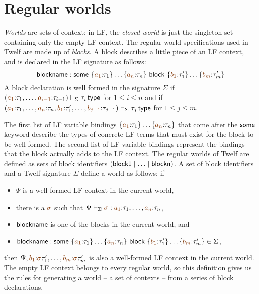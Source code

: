 

\section{Regular worlds}
\label{sec:gen-worlds}

{\it Worlds} are sets of context: in LF, the {\it closed world} is
just the singleton set containing only the empty LF context.  The
regular world specifications used in Twelf
\cite{schurmann00automating} are made up of {\it blocks}. A block
describes a little piece of an LF context, and is declared in the LF
signature as follows:
\[
 {\sf blockname} :
 {\sf some}~\{\lf{a_1}{:}\tau_1\}\ldots\{\lf{a_n}{:}\tau_n\}
~{\sf block}~\{\lf{b_1}{:}\tau'_1\}\ldots\{\lf{b_m}{:}\tau'_m\}
\]
A block declaration is well formed in the signature $\Sigma$ if 
$\left(\lf{a_1}{:}\tau_1,\ldots,\lf{a_{i-1}}{:} \tau_{i-1} \right)\vdash_\Sigma
\tau_i \,{\sf type}$ for $1 \leq i \leq n$ and if 
$\left(\lf{a_1}{:}\tau_1,\ldots,\lf{a_{n}}{:} \tau_{n},
 \lf{b_1}{:}\tau'_1,\ldots,\lf{b_{j-1}}{:}\tau_{j-1}\right) \vdash_\Sigma
\tau_j \,{\sf type}$ for $1 \leq j \leq m$. 

The first list of LF variable bindings
$\{\lf{a_1}{:}\tau_1\}\ldots\{\lf{a_n}{:}\tau_n\}$ that 
come after the ${\sf some}$ keyword describe the types
of concrete LF terms that must exist for the block to be well formed.
The second list of LF variable bindings represent the bindings that
the block actually adds to the LF context. The regular worlds of 
Twelf are defined as sets of block identifiers 
$({\sf block1} \mid \ldots \mid {\sf blockn})$. A set of block identifiers
and a Twelf signature $\Sigma$ define a world as follows: if
\smallskip
\begin{itemize}
\item $\Psi$ is a well-formed
LF context in the current world, 
\item there is a $\lf{\sigma}$ such that
$\Psi \vdash_\Sigma \lf{\sigma} :
\lf{a_1}{:}\tau_1,\ldots,\lf{a_n}{:}\tau_n$, 
\item ${\sf blockname}$ is one of the blocks in the current world, and
\item ${\sf blockname} :
 {\sf some}~\{\lf{a_1}{:}\tau_1\}\ldots\{\lf{a_n}{:}\tau_n\}
~{\sf block}~\{\lf{b_1}{:}\tau'_1\}\ldots\{\lf{b_m}{:}\tau'_m\} \in \Sigma$,
\end{itemize}
\smallskip
then $\Psi,
\lf{b_1}{:}\lf\sigma\tau'_1,\ldots, \lf{b_m}{:}\lf\sigma\tau'_m$ is
also a well-formed LF context in the current world. The empty LF context
belongs to every regular world, so this definition gives us the rules for 
generating a world -- a set of contexts -- from a series of block 
declarations. 

